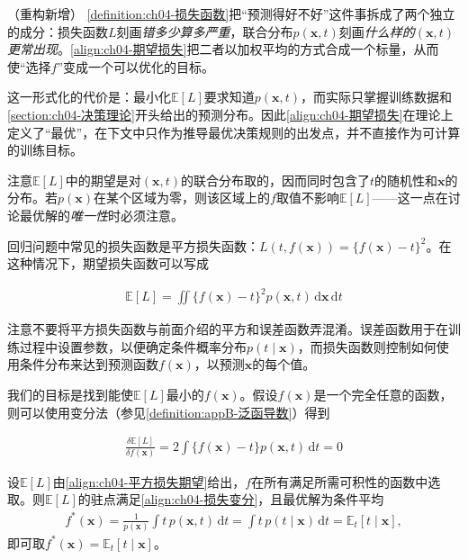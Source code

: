 \documentclass[../../main.tex]{subfiles}
\begin{document}
\begin{remark}（重构新增）
\cref{definition:ch04-损失函数}把“预测得好不好”这件事拆成了两个独立的成分：损失函数$L$刻画\emph{错多少算多严重}，联合分布$p(\boldsymbol{x},t)$刻画\emph{什么样的$({\boldsymbol{x}},t)$更常出现}。\eqref{align:ch04-期望损失}把二者以加权平均的方式合成一个标量，从而使“选择$f$”变成一个可以优化的目标。

这一形式化的代价是：最小化$\mathbb{E}[L]$要求知道$p(\boldsymbol{x},t)$，而实际只掌握训练数据和\cref{section:ch04-决策理论}开头给出的预测分布。因此\eqref{align:ch04-期望损失}在理论上定义了“最优”，在下文中只作为推导最优决策规则的出发点，并不直接作为可计算的训练目标。

注意$\mathbb{E}[L]$中的期望是对$({\boldsymbol{x}},t)$的联合分布取的，因而同时包含了$t$的随机性和$\boldsymbol{x}$的分布。若$p(\boldsymbol{x})$在某个区域为零，则该区域上的$f$取值不影响$\mathbb{E}[L]$——这一点在讨论最优解的\emph{唯一性}时必须注意。
\end{remark}

回归问题中常见的损失函数是平方损失函数：$L(t,f(\boldsymbol{x}))=\{f(\boldsymbol{x})-t\}^2$。在这种情况下，期望损失函数可以写成

\begin{align}
  \mathbb{E}[L]=\iint\{f(\boldsymbol{x})-t\}^2p(\boldsymbol{x},t)\,\mathrm{d}\boldsymbol{x}\,\mathrm{d}t
  \label{align:ch04-平方损失期望}
\end{align}

注意不要将平方损失函数与前面介绍的平方和误差函数弄混淆。误差函数用于在训练过程中设置参数，以便确定条件概率分布$p(t\mid\boldsymbol{x})$，而损失函数则控制如何使用条件分布来达到预测函数$f(\boldsymbol{x})$，以预测$\boldsymbol{x}$的每个值。

我们的目标是找到能使$\mathbb{E}[L]$最小的$f(\boldsymbol{x})$。假设$f(\boldsymbol{x})$是一个完全任意的函数，则可以使用变分法（参见\cref{definition:appB-泛函导数}）得到

\begin{align}
  \frac{\delta\mathbb{E}[L]}{\delta f(\boldsymbol{x})}=2\int\{f(\boldsymbol{x})-t\}p(\boldsymbol{x},t)\,\mathrm{d}t=0
  \label{align:ch04-损失变分}
\end{align}

\begin{proposition}[平方损失的最优决策规则]\label{proposition:ch04-最优决策规则}
设$\mathbb{E}[L]$由\eqref{align:ch04-平方损失期望}给出，$f$在所有满足所需可积性的函数中选取。则$\mathbb{E}[L]$的驻点满足\eqref{align:ch04-损失变分}，且最优解为条件平均
\begin{align}
  f^*(\boldsymbol{x})=\frac{1}{p(\boldsymbol{x})}\int t\,p(\boldsymbol{x},t)\,\mathrm{d}t=\int t\,p(t\mid\boldsymbol{x})\,\mathrm{d}t=\mathbb{E}_t[t\mid\boldsymbol{x}],
  \label{align:ch04-回归函数}
\end{align}
即可取$f^*(\boldsymbol{x})=\mathbb{E}_t[t\mid\boldsymbol{x}]$。
\end{proposition}
\end{document}
